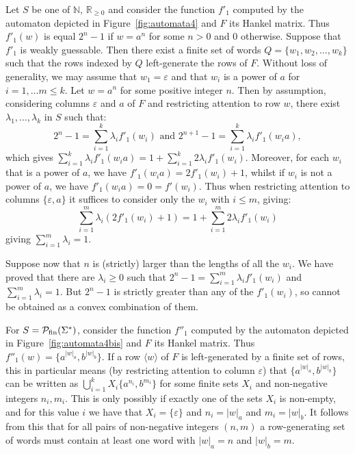 \documentclass{lmcs}
\numberwithin{theorem}{section}
\begin{document}
	Let $S$ be one of $\mathbb{N}$, $\mathbb{R}_{\geq 0}$ and consider the function $f'_1$ computed by the automaton depicted in Figure~\ref{fig:automata4} and $F$ its Hankel matrix. Thus $f'_1(w)$ is equal $2^n - 1$ if $w=a^n$ for some $n>0$ and $0$ otherwise. Suppose that $f'_1$ is weakly guessable. Then there exist a finite set of words $Q = \{w_1, w_2, \ldots, w_k\}$ such that the rows indexed by $Q$ left-generate the rows of $F$. Without loss of generality, we may assume that $w_1 = \varepsilon$ and that $w_i$ is a power of $a$ for $i=1, \ldots m \leq k$. Let $w = a^{n}$ for some positive integer $n$. Then by assumption, considering columns $\varepsilon$ and $a$ of $F$ and restricting attention to row $w$, there exist $\lambda_1, \ldots, \lambda_k$ in $S$ such that:
	\[2^{n} - 1 = \sum_{i=1}^k \lambda_i f'_1(w_i) \mbox{ and  }2^{n+1} - 1 = \sum_{i=1}^k \lambda_i f'_1(w_ia),\] which gives $\sum_{i=1}^k \lambda_i f'_1(w_ia) = 1+  \sum_{i=1}^k 2\lambda_i f'_1(w_i).$ Moreover, for each $w_i$ that is a power of $a$, we have $f'_1(w_ia) = 2f'_1(w_i) + 1$, whilst if $w_i$ is not a power of $a$, we have $f'_1(w_ia) = 0 = f'(w_i)$. Thus when restricting attention to columns $\{\varepsilon, a\}$ it suffices to consider only the $w_i$ with $i \leq m$, giving:
	\[\sum_{i=1}^m \lambda_i (2f'_1(w_i) + 1) = 1 + \sum_{i=1}^m 2\lambda_i f'_1(w_i)\]
	giving $\sum_{i=1}^m \lambda_i=1$.
	
	Suppose now that $n$ is (strictly) larger than the lengths of all the $w_i$. We have proved that there are $\lambda_i \geq 0$ such that $2^{n} - 1 = \sum_{i=1}^m \lambda_i f'_1(w_i)$ and $\sum_{i=1}^m \lambda_i=1$. But $2^n - 1$ is strictly greater than any of the $f'_1(w_i)$, so cannot be obtained as a convex combination of them. 
	
	For $S=\mathcal{P}_{\rm fin}(\Sigma^*)$, consider the function $f''_1$ computed by the automaton depicted in Figure~\ref{fig:automata4bis} and $F$ its Hankel matrix. Thus $f''_1(w) = \{a^{|w|_a},b^{|w|_b}\}$. If a row $\langle w \rangle$ of $F$  is left-generated by a finite set of rows, this in particular means (by restricting attention to column $\varepsilon$) that $\{a^{|w|_a}, b^{|w|_b}\}$ can be written as $\bigcup_{i=1}^k X_i\{a^{n_i}, b^{m_i}\}$ for some  finite sets $X_i$ and non-negative integers $n_i,m_i$. This is only possibly if exactly one of the sets $X_i$ is non-empty, and for this value $i$ we have that $X_i = \{\varepsilon\}$ and $n_i = |w|_a$ and  $m_i = |w|_b$. It follows from this that for all pairs of non-negative integers $(n,m)$ a row-generating set of words must contain at least one word with $|w|_a=n$ and $|w|_b=m$.
	\vspace{-1\baselineskip}
\end{document}
